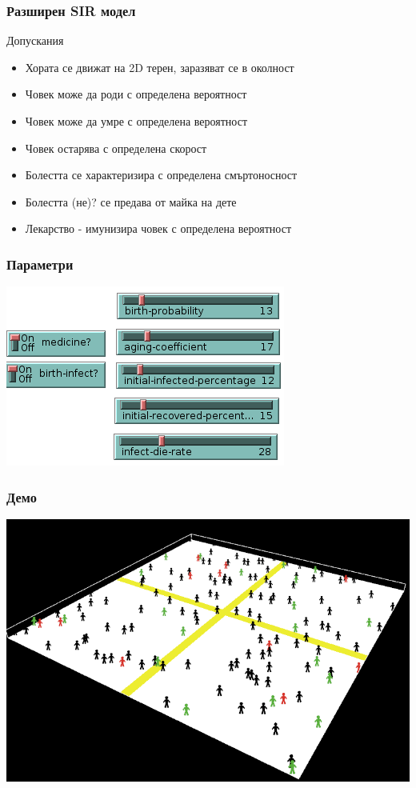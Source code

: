 \documentclass[14pt]{beamer}
\begin{document}
\begin{frame}
\frametitle{Разширен SIR модел}
Допускания
\begin{itemize}
    \item {Хората се движат на 2D терен, заразяват се в околност}
    \item {Човек може да роди с определена вероятност}
    \item {Човек може да умре с определена вероятност}
    \item {Човек остарява с определена скорост}
    \item {Болестта се характеризира с определена смъртоносност}
    \item {Болестта (не)? се предава от майка на дете}
    \item {Лекарство - имунизира човек с определена вероятност}
\end{itemize}
\end{frame}

\begin{frame}
\frametitle{Параметри}
    \includegraphics[width=0.8\linewidth] {parameters}
\end{frame}

\begin{frame}
\frametitle{Демо}
    \includegraphics[width=0.8\linewidth] {demo}
\end{frame}
\end{document}
